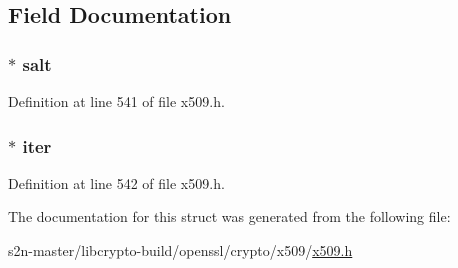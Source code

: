 \subsection{Field Documentation}
\subsubsection[{\texorpdfstring{salt}{salt}}]{ $\ast$ salt}\hypertarget{struct_p_b_e_p_a_r_a_m__st_aaebd8a6f08ab440b05bacfa9bd8af07f}{}\label{struct_p_b_e_p_a_r_a_m__st_aaebd8a6f08ab440b05bacfa9bd8af07f}


Definition at line 541 of file x509.\+h.

\subsubsection[{\texorpdfstring{iter}{iter}}]{ $\ast$ iter}\hypertarget{struct_p_b_e_p_a_r_a_m__st_ab7b90cf95e75c0cd6742cfe1aad7dd03}{}\label{struct_p_b_e_p_a_r_a_m__st_ab7b90cf95e75c0cd6742cfe1aad7dd03}


Definition at line 542 of file x509.\+h.



The documentation for this struct was generated from the following file\+:\begin{DoxyCompactItemize}
\item 
s2n-\/master/libcrypto-\/build/openssl/crypto/x509/\hyperlink{crypto_2x509_2x509_8h}{x509.\+h}\end{DoxyCompactItemize}
